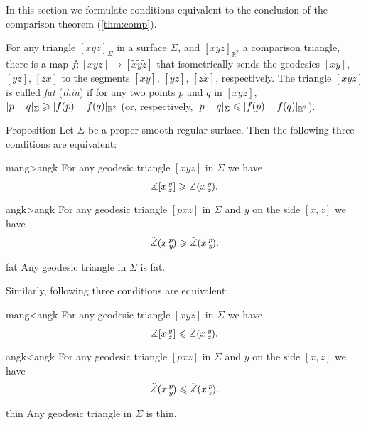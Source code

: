 In this section we formulate conditions equivalent to the conclusion of the comparison theorem (\ref{thm:comp}).

For any triangle $[xyz]_{\Sigma}$ in a surface $\Sigma$, and $[\tilde x \tilde y \tilde z]_{\mathbb{R}^2}$ a comparison triangle, there is a map $f :[xyz]\to [\tilde x \tilde y \tilde z ]$ that isometrically  sends the geodesics $[xy]$, $[yz]$, $[zx]$ to the segments $[\tilde x \tilde y ]$, $[\tilde y \tilde z]$, $[ \tilde z \tilde x ]$, respectively.
The triangle $[xyz]$ is called \emph{fat} (\emph{thin})
if for any two points $p$ and $q$  in $[xyz]$,  $\dist{p}{q}{\Sigma}\ge |f( p)- f( q)|_{\mathbb{R}^2}$ (or, respectively, $\dist{p}{q}{\Sigma}\le | f( p) - f( q) |_{\mathbb{R}^2}$).


\begin{thm}{Proposition}\label{prop:comp-reformulations}
Let $\Sigma$ be a proper smooth regular surface.
Then the following three conditions are equivalent:

\begin{subthm}{mang>angk}
For any geodesic triangle $[xyz]$ in $\Sigma$ we have
 \[\measuredangle[x\,{}^{y}_{z}]\geqslant\tilde\measuredangle(x\,{}^{y}_{z}\hspace{-0.2ex}).\]
\end{subthm}

\begin{subthm}{angk>angk} For any geodesic triangle $[pxz]$ in $\Sigma$ and $y$ on the side $[x,z]$ we have
 \[\tilde\measuredangle(x\,{}^{p}_{y}\hspace{-0.2ex}) \geqslant \tilde\measuredangle(x\,{}^{p}_{z}\hspace{-0.2ex}).\]
 
\end{subthm}

\begin{subthm}{fat}
 Any geodesic triangle in $\Sigma$ is fat.
\end{subthm}


\medskip

Similarly, following three conditions are equivalent:

\begin{subthmA}{mang<angk}
For any geodesic triangle $[xyz]$ in $\Sigma$ we have
 \[\measuredangle[x\,{}^{y}_{z}]\leqslant\tilde\measuredangle(x\,{}^{y}_{z}\hspace{-0.2ex}).\]
\end{subthmA}

\begin{subthmA}{angk<angk} For any geodesic triangle $[pxz]$ in $\Sigma$ and $y$ on the side $[x,z]$ we have
 \[\tilde\measuredangle(x\,{}^{p}_{y}\hspace{-0.2ex}) \leqslant \tilde\measuredangle(x\,{}^{p}_{z}\hspace{-0.2ex}).\]
\end{subthmA}

\begin{subthmA}{thin}
Any geodesic triangle in $\Sigma$ is thin.
\end{subthmA}

\end{thm}

